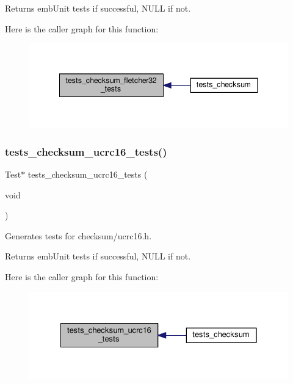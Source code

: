 \begin{DoxyReturn}{Returns}
emb\+Unit tests if successful, N\+U\+LL if not. 
\end{DoxyReturn}
Here is the caller graph for this function\+:
\nopagebreak
\begin{figure}[H]
\begin{center}
\leavevmode
\includegraphics[width=342pt]{group__unittests_gaa0b18302e117209cfda9e5cdc7cd5af8_icgraph}
\end{center}
\end{figure}
\mbox{\label{group__unittests_gab30c0b0af5fcf4297ab2f8321a2838da}} 
\subsubsection{\texorpdfstring{tests\+\_\+checksum\+\_\+ucrc16\+\_\+tests()}{tests\_checksum\_ucrc16\_tests()}}
{\footnotesize\ttfamily Test$\ast$ tests\+\_\+checksum\+\_\+ucrc16\+\_\+tests (\begin{DoxyParamCaption}\item[{void}]{ }\end{DoxyParamCaption})}



Generates tests for checksum/ucrc16.\+h. 

\begin{DoxyReturn}{Returns}
emb\+Unit tests if successful, N\+U\+LL if not. 
\end{DoxyReturn}
Here is the caller graph for this function\+:
\nopagebreak
\begin{figure}[H]
\begin{center}
\leavevmode
\includegraphics[width=328pt]{group__unittests_gab30c0b0af5fcf4297ab2f8321a2838da_icgraph}
\end{center}
\end{figure}
\mbox{\label{group__unittests_ga211fe87abc68d3c2ef15a3db1dfbcb48}} 
